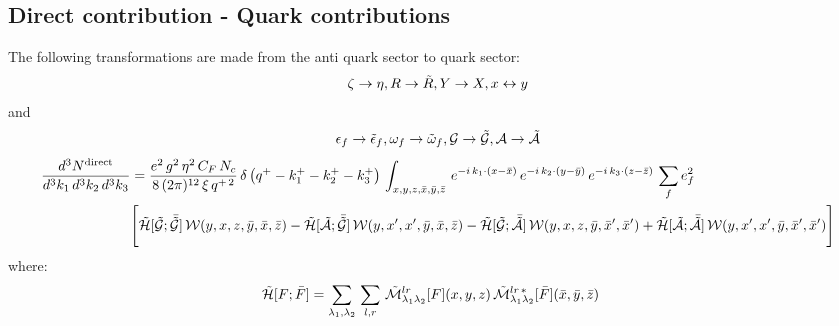 \documentclass[9pt]{article}
\numberwithin{equation}{section}
\begin{document}
\subsection{Direct contribution - Quark contributions}
The following transformations are made from the anti quark sector to quark sector: \
$$\zeta\rightarrow \eta, R\rightarrow \Tilde{R}, Y \rightarrow X, x\leftrightarrow y$$
and 
$$\epsilon_{f}\rightarrow \Tilde{\epsilon}_{f}, \omega_{f}\rightarrow \Tilde{\omega}_{f}, \mathcal{G} \rightarrow \mathcal{\Tilde{G}}, \mathcal{A} \rightarrow \mathcal{\Tilde{A}}$$
\begin{align}
     \frac{d^{3}N^{\text{direct}}}{d^{3}k_{1}\,d^{3}k_{2}\, d^{3}k_{3}} & = \frac{e^{2}\,g^{2}\,\eta^{2}\,C_{F}\,N_{c}}{8\, (2\pi)^{12}\,\xi\,q^{+\,2}}\, \delta\left(q^{+}-k^{+}_{1}-k^{+}_{2}-k^{+}_{3}\right)\, \int_{x,y,z,\Bar{x},\Bar{y},\Bar{z}}\, e^{-i\,k_{1}\cdot (x-\Bar{x})}\, e^{-i\,k_{2}\cdot (y-\Bar{y})}\, e^{-i\,k_{3}\cdot (z-\Bar{z})}\,\sum_{f}e^{2}_{f}\notag \\ & \Bigg[\mathcal{\Tilde{H}}[\mathcal{\Tilde{G}};\mathcal{\Bar{\Tilde{G}}}]\,\mathcal{W}(y,x,z,\Bar{y},\Bar{x},\Bar{z}) - \mathcal{\Tilde{H}}[\mathcal{\Tilde{A}};\mathcal{\Bar{\Tilde{G}}}]\,\mathcal{W}(y,x',x',\Bar{y},\Bar{x},\Bar{z})-\mathcal{\Tilde{H}}[\mathcal{\Tilde{G}};\mathcal{\Bar{\Tilde{A}}}]\,\mathcal{W}(y,x,z,\Bar{y},\Bar{x}',\Bar{x}')+ \mathcal{\Tilde{H}}[\mathcal{\Tilde{A}};\mathcal{\Bar{\Tilde{A}}}]\,\mathcal{W}(y,x',x',\Bar{y},\Bar{x}',\Bar{x}')\Bigg]
\end{align}
where:
\begin{align}
    \mathcal{\Tilde{H}}[F;\Bar{F}] & = \sum_{\lambda_{1},\lambda_{2}}\, \sum_{l,r}\, \mathcal{\Tilde{M}}^{lr}_{\lambda_{1}\lambda_{2}}[F](x,y,z)\, \mathcal{\Tilde{M}}^{lr\,*}_{\lambda_{1}\lambda_{2}}[\Bar{F}](\Bar{x},\Bar{y},\Bar{z})
\end{align}
\end{document}
